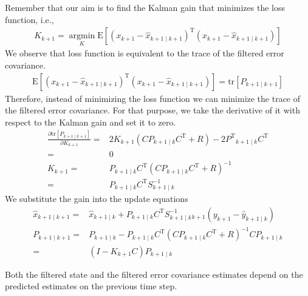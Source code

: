 \documentclass[twoside]{article}
\renewcommand{\t}{^\mathrm{T}{}}
\newcommand{\E}{\mathrm{E}{}}
\newcommand{\tr}{\mathrm{tr}{}}
\newcommand{\kp}{_{k+1}{}}
\newcommand{\kpk}{_{k+1\mid k}{}}
\newcommand{\kpkp}{_{k+1\mid k+1}{}}
\DeclareMathOperator*{\argmin}{argmin}
\begin{document}
Remember that our aim is to find the Kalman gain that minimizes the loss function, i.e.,
\begin{align*}
	K\kp = \underset{K}{\argmin} \E\left[(x\kp-\hat x\kpkp)\t(x\kp-\hat x\kpkp) \right] 
\end{align*}
We observe that loss function is equivalent to the trace of the filtered error covariance.
\begin{align*}
	\E\left[(x\kp-\hat x\kpkp)\t(x\kp-\hat x\kpkp) \right]  = \tr\left[ P\kpkp\right] 
\end{align*}
Therefore, instead of minimizing the loss function we can minimize the trace of the filtered error covariance. For that purpose, we take the derivative of it with respect to the Kalman gain and set it to zero.
\begin{align*}
	\frac{\partial \tr\left[ P\kpkp\right] }{\partial K\kp } =& 2K\kp (C P\kpk C\t + R) - 2P\t\kpk C\t\\
	=& 0\\
	K\kp =& P\kpk C\t (C P\kpk C\t + R)^{-1}\\
	=& P\kpk C\t S^{-1}\kpk
\end{align*}
We substitute the gain into the update equations
\begin{align*}
	\hat x\kpkp =& \hat x\kpk + P\kpk C\t S^{-1}\kpk\kp (y\kp - \hat y\kpk)\\
	P\kpkp =& P\kpk - P\kpk C\t (CP\kpk C\t + R)^{-1} C P\kpk\\
	=& (I - K\kp C)P\kpk
\end{align*}
\begin{tcolorbox} [colback=blue!5!white,colframe=blue!75!black,title=\textbf{Remark}:,subtitle style={boxrule=0.4pt,
		colback=yellow!50!red!25!white}]
	Both the filtered state and the filtered error covariance estimates depend on the predicted estimates on the previous time step.
\end{tcolorbox}
\newpage
\end{document}
